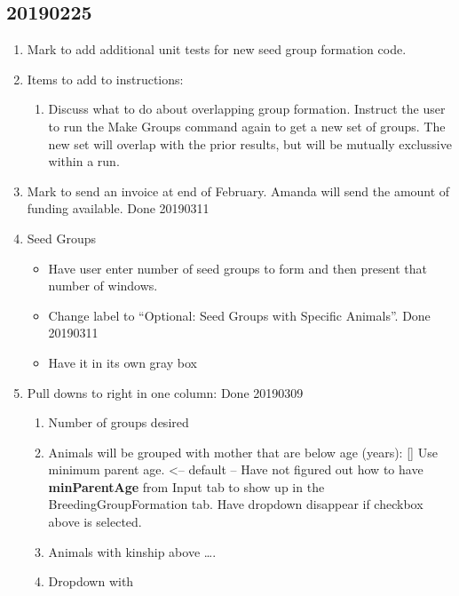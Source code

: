 \documentclass[
]{article}
\providecommand{\tightlist}{%
  \setlength{\itemsep}{0pt}\setlength{\parskip}{0pt}}
\begin{document}
\hypertarget{section-15}{%
\subsection{20190225}\label{section-15}}

\begin{enumerate}
\def\labelenumi{\arabic{enumi}.}
\tightlist
\item
  Mark to add additional unit tests for new seed group formation code.
\item
  Items to add to instructions:

  \begin{enumerate}
  \def\labelenumii{\alph{enumii}.}
  \tightlist
  \item
    Discuss what to do about overlapping group formation. Instruct the
    user to run the Make Groups command again to get a new set of
    groups. The new set will overlap with the prior results, but will be
    mutually exclussive within a run.
  \end{enumerate}
\item
  Mark to send an invoice at end of February. Amanda will send the
  amount of funding available. Done 20190311
\item
  Seed Groups

  \begin{itemize}
  \tightlist
  \item
    Have user enter number of seed groups to form and then present that
    number of windows.
  \item
    Change label to ``Optional: Seed Groups with Specific Animals''.
    Done 20190311
  \item
    Have it in its own gray box
  \end{itemize}
\item
  Pull downs to right in one column: Done 20190309

  \begin{enumerate}
  \def\labelenumii{\alph{enumii}.}
  \tightlist
  \item
    Number of groups desired
  \item
    Animals will be grouped with mother that are below age (years):
    {[}{]} Use minimum parent age. \textless-- default -- Have not
    figured out how to have \textbf{minParentAge} from Input tab to show
    up in the BreedingGroupFormation tab. Have dropdown disappear if
    checkbox above is selected.
  \item
    Animals with kinship above \ldots.
  \item
    Dropdown with


\end{enumerate}
\end{enumerate}
\end{document}
